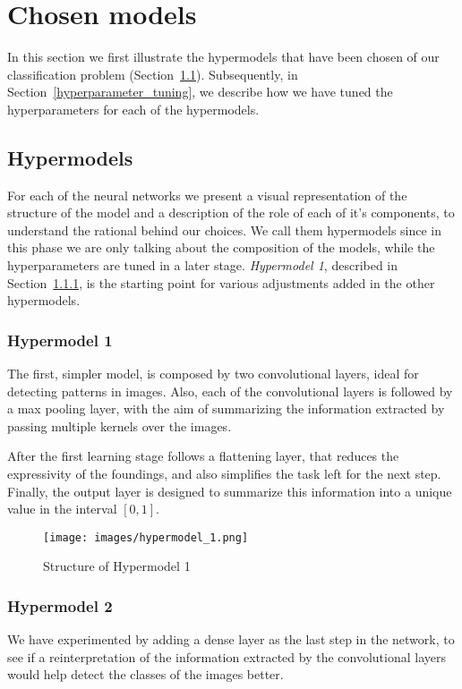 \section{Chosen models}\label{2_models}
In this section we first illustrate the hypermodels that have been chosen of our classification problem (Section~\ref{hypermodels}). Subsequently, in Section~\ref{hyperparameter_tuning}, we describe how we have tuned the hyperparameters for each of the hypermodels.

\subsection{Hypermodels}\label{hypermodels}
For each of the neural networks we present a visual representation of the structure of the model and a description of the role of each of it's components, to understand the rational behind our choices. We call them hypermodels since in this phase we are only talking about the composition of the models, while the hyperparameters are tuned in a later stage. \textsl{Hypermodel 1}, described in Section~\ref{hypermodel_1}, is the starting point for various adjustments added in the other hypermodels.

\subsubsection{Hypermodel 1}\label{hypermodel_1}
The first, simpler model, is composed by two convolutional layers, ideal for detecting patterns in images. Also, each of the convolutional layers is followed by a max pooling layer, with the aim of summarizing the information extracted by passing multiple kernels over the images.

After the first learning stage follows a flattening layer, that reduces the expressivity of the foundings, and also simplifies the task left for the next step. Finally, the output layer is designed to summarize this information into a unique value in the interval $\left[0,1\right]$.

\begin{figure}[h]
    \label{fig:Hypermodel_1}
    \centering
    \texttt{[image: images/hypermodel\_1.png]}
    \caption{Structure of Hypermodel 1}
\end{figure}

\subsubsection{Hypermodel 2}\label{hypermodel_2}
We have experimented by adding a dense layer as the last step in the network, to see if a reinterpretation of the information extracted by the convolutional layers would help detect the classes of the images better.

